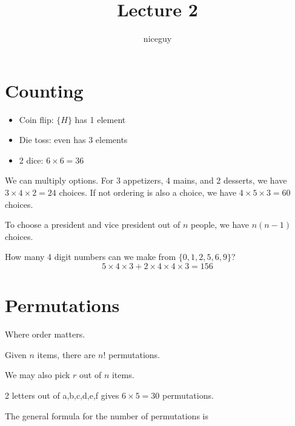 \documentclass[12pt]{article}
\author{niceguy}
\title{Lecture 2}
\begin{document}
\maketitle

\section{Counting}

\begin{ex}
	\begin{itemize}
		\item Coin flip: $\{H\}$ has 1 element
		\item Die toss: {even} has 3 elements
		\item 2 dice: $6 \times 6 = 36$
	\end{itemize}
\end{ex}

\begin{ex}
	We can multiply options. For 3 appetizers, 4 mains, and 2 desserts, we have $3\times4\times2=24$ choices. If not ordering is also a choice, we have $4\times5\times3=60$ choices.
\end{ex}

\begin{ex}
	To choose a president and vice president out of $n$ people, we have $n(n-1)$ choices.
\end{ex}

\begin{ex}
	How many 4 digit numbers can we make from $\{0,1,2,5,6,9\}$? \\
	$$5\times4\times3 + 2\times4\times4\times3 = 156$$
\end{ex}

\section{Permutations}

Where order matters.

\begin{ex}
	Given $n$ items, there are $n!$ permutations.
\end{ex}

We may also pick $r$ out of $n$ items.

\begin{ex}
	2 letters out of {a,b,c,d,e,f} gives $6 \times 5 = 30$ permutations.
\end{ex}

The general formula for the number of permutations is
\end{document}

